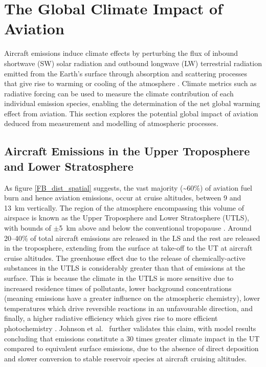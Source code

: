 \section{The Global Climate Impact of Aviation}
\label{climate}
Aircraft emissions induce climate effects by perturbing the flux of inbound shortwave (SW) solar radiation and outbound longwave (LW) terrestrial radiation emitted from the Earth's surface through absorption and scattering processes that give rise to warming or cooling of the atmosphere \cite{Myhre2013}. Climate metrics such as radiative forcing can be used to measure the climate contribution of each individual emission species, enabling the determination of the net global warming effect from aviation. This section explores the potential global impact of aviation deduced from measurement and modelling of atmospheric processes.


\subsection{Aircraft Emissions in the Upper Troposphere and Lower Stratosphere}
\label{UTLS_climate} 
As figure \ref{FB_dist_spatial} suggests, the vast majority (\textasciitilde60\%) of aviation fuel burn and hence aviation emissions, occur at cruise altitudes, between 9 and 13~km vertically. The region of the atmosphere encompassing this volume of airspace is known as the Upper Troposphere and Lower Stratosphere (UTLS), with bounds of $\pm$5~km above and below the conventional tropopause \cite{Gettelman2011}. Around 20--40\% of total aircraft emissions are released in the LS \cite{IPCC1999, Hoinka1993} and the rest are released in the troposphere, extending from the surface at take-off to the UT at aircraft cruise altitudes. The greenhouse effect due to the release of chemically-active substances in the UTLS is considerably greater than that of emissions at the surface. This is because the climate in the UTLS is more sensitive due to increased residence times of pollutants, lower background concentrations (meaning emissions have a greater influence on the atmospheric chemistry), lower temperatures which drive reversible reactions in an unfavourable direction, and finally, a higher radiative efficiency which gives rise to more efficient photochemistry \cite{Schumann1997}. Johnson et al.\ \cite{Johnson1992} further validates this claim, with model results concluding that  emissions constitute a 30 times greater climate impact in the UT compared to equivalent surface emissions, due to the absence of direct deposition and slower conversion to stable reservoir species at aircraft cruising altitudes.

